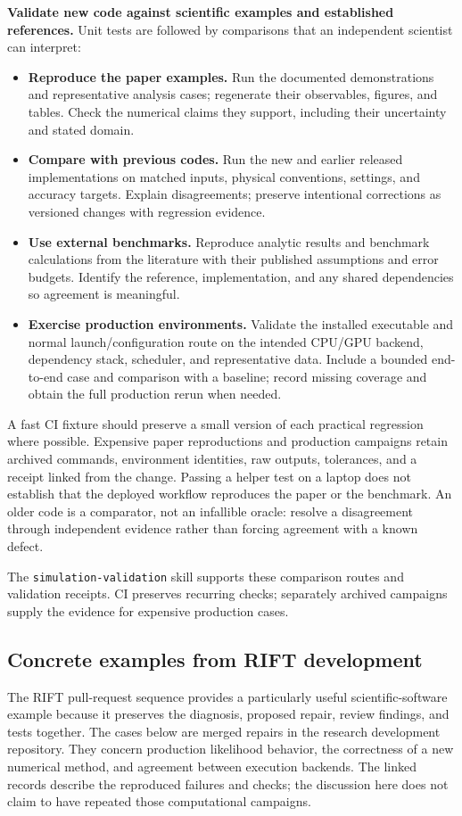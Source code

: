 \documentclass[aps,prd,reprint,nofootinbib]{revtex4-2}
\begin{document}
\textbf{Validate new code against scientific examples and established references.} Unit tests are followed by comparisons that an independent scientist can interpret:
\begin{itemize}
\item \textbf{Reproduce the paper examples.} Run the documented demonstrations and representative analysis cases; regenerate their observables, figures, and tables. Check the numerical claims they support, including their uncertainty and stated domain.
\item \textbf{Compare with previous codes.} Run the new and earlier released implementations on matched inputs, physical conventions, settings, and accuracy targets. Explain disagreements; preserve intentional corrections as versioned changes with regression evidence.
\item \textbf{Use external benchmarks.} Reproduce analytic results and benchmark calculations from the literature with their published assumptions and error budgets. Identify the reference, implementation, and any shared dependencies so agreement is meaningful.
\item \textbf{Exercise production environments.} Validate the installed executable and normal launch/configuration route on the intended CPU/GPU backend, dependency stack, scheduler, and representative data. Include a bounded end-to-end case and comparison with a baseline; record missing coverage and obtain the full production rerun when needed.
\end{itemize}
A fast CI fixture should preserve a small version of each practical regression where possible. Expensive paper reproductions and production campaigns retain archived commands, environment identities, raw outputs, tolerances, and a receipt linked from the change. Passing a helper test on a laptop does not establish that the deployed workflow reproduces the paper or the benchmark. An older code is a comparator, not an infallible oracle: resolve a disagreement through independent evidence rather than forcing agreement with a known defect.

The \texttt{simulation-validation} skill supports these comparison routes and validation receipts. CI preserves recurring checks; separately archived campaigns supply the evidence for expensive production cases.

\subsection{Concrete examples from RIFT development}
The RIFT pull-request sequence provides a particularly useful scientific-software example because it preserves the diagnosis, proposed repair, review findings, and tests together. The cases below are merged repairs in the research development repository. They concern production likelihood behavior, the correctness of a new numerical method, and agreement between execution backends. The linked records describe the reproduced failures and checks; the discussion here does not claim to have repeated those computational campaigns.
\end{document}
